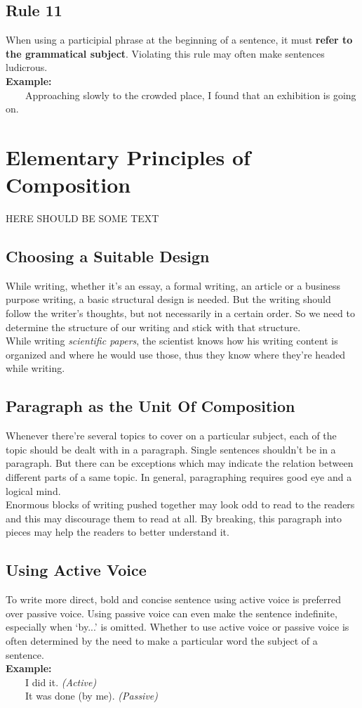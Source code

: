 \documentclass{report}
\newcommand{\xmpl}{\textbf{Example:}\\} %
\newcommand{\indnt}{\ \ \ \ } %
\begin{document}
\section{Rule 11}\label{rl11}
When using a participial phrase at the beginning of a sentence, it must \textbf{refer to the grammatical subject}. Violating this rule may often make sentences ludicrous.\\
\xmpl
\indnt Approaching slowly to the crowded place, I found that an exhibition is going on.

\chapter{Elementary Principles of Composition}
HERE SHOULD BE SOME TEXT

\section{Choosing a Suitable Design} \label{CSD}
While writing, whether it's an essay, a formal writing, an article or a business purpose writing, a basic structural design is needed. But the writing should follow the writer's thoughts, but not necessarily in a certain order. So we need to determine the structure of our writing and stick with that structure.\\
While writing \emph{scientific papers}, the scientist knows how his writing content is organized and where he would use those, thus they know where they're headed while writing.
\section{Paragraph as the Unit Of Composition}
Whenever there're several topics to cover on a particular subject, each of the topic should be dealt with in a paragraph. Single sentences shouldn't be in a paragraph. But there can be exceptions which may indicate the relation between different parts of a same topic. In general, paragraphing requires good eye and a logical mind.\\
Enormous blocks of writing pushed together may look odd to read to the readers and this may discourage them to read at all. By breaking, this paragraph into pieces may help the readers to better understand it.
\section{Using Active Voice}
To write more direct, bold and concise sentence using active voice is preferred over passive voice. Using passive voice can even make the sentence indefinite, especially when `by...' is omitted. Whether to use active voice or passive voice is often determined by the need to make a particular word the subject of a sentence.\\
\xmpl
\indnt I did it. \emph{(Active)}\\
\indnt It was done (by me). \emph{(Passive)}
\end{document}
